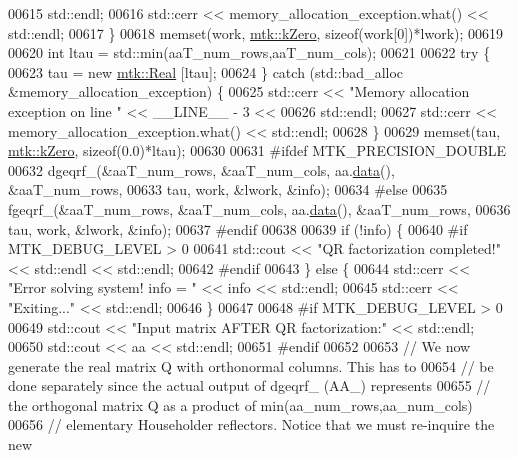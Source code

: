 \begin{DoxyCode}
00615       std::endl;
00616     std::cerr << memory\_allocation\_exception.what() << std::endl;
00617   \}
00618   memset(work, \hyperlink{group__c01-roots_ga59a451a5fae30d59649bcda274fea271}{mtk::kZero}, \textcolor{keyword}{sizeof}(work[0])*lwork);
00619 
00620   \textcolor{keywordtype}{int} ltau = std::min(aaT\_num\_rows,aaT\_num\_cols);
00621 
00622   \textcolor{keywordflow}{try} \{
00623     tau = \textcolor{keyword}{new} \hyperlink{group__c01-roots_gac080bbbf5cbb5502c9f00405f894857d}{mtk::Real} [ltau];
00624   \} \textcolor{keywordflow}{catch} (std::bad\_alloc &memory\_allocation\_exception) \{
00625     std::cerr << \textcolor{stringliteral}{"Memory allocation exception on line "} << \_\_LINE\_\_ - 3 <<
00626       std::endl;
00627     std::cerr << memory\_allocation\_exception.what() << std::endl;
00628   \}
00629   memset(tau, \hyperlink{group__c01-roots_ga59a451a5fae30d59649bcda274fea271}{mtk::kZero}, \textcolor{keyword}{sizeof}(0.0)*ltau);
00630 
00631 \textcolor{preprocessor}{  #ifdef MTK\_PRECISION\_DOUBLE}
00632   dgeqrf\_(&aaT\_num\_rows, &aaT\_num\_cols, aa.\hyperlink{classmtk_1_1DenseMatrix_a16b3ff56feb2658b9fc7147d1de4d8e7}{data}(), &aaT\_num\_rows,
00633           tau, work, &lwork, &info);
00634 \textcolor{preprocessor}{  #else}
00635   fgeqrf\_(&aaT\_num\_rows, &aaT\_num\_cols, aa.\hyperlink{classmtk_1_1DenseMatrix_a16b3ff56feb2658b9fc7147d1de4d8e7}{data}(), &aaT\_num\_rows,
00636           tau, work, &lwork, &info);
00637 \textcolor{preprocessor}{  #endif}
00638 
00639   \textcolor{keywordflow}{if} (!info) \{
00640 \textcolor{preprocessor}{    #if MTK\_DEBUG\_LEVEL > 0}
00641     std::cout << \textcolor{stringliteral}{"QR factorization completed!"} << std::endl << std::endl;
00642 \textcolor{preprocessor}{    #endif}
00643   \} \textcolor{keywordflow}{else} \{
00644     std::cerr << \textcolor{stringliteral}{"Error solving system! info = "} << info << std::endl;
00645     std::cerr << \textcolor{stringliteral}{"Exiting..."} << std::endl;
00646   \}
00647 
00648 \textcolor{preprocessor}{  #if MTK\_DEBUG\_LEVEL > 0}
00649   std::cout << \textcolor{stringliteral}{"Input matrix AFTER QR factorization:"} << std::endl;
00650   std::cout << aa << std::endl;
00651 \textcolor{preprocessor}{  #endif}
00652 
00653   \textcolor{comment}{// We now generate the real matrix Q with orthonormal columns. This has to}
00654   \textcolor{comment}{// be done separately since the actual output of dgeqrf\_ (AA\_) represents}
00655   \textcolor{comment}{// the orthogonal matrix Q as a product of min(aa\_num\_rows,aa\_num\_cols)}
00656   \textcolor{comment}{// elementary Householder reflectors. Notice that we must re-inquire the new}

\end{DoxyCode}
